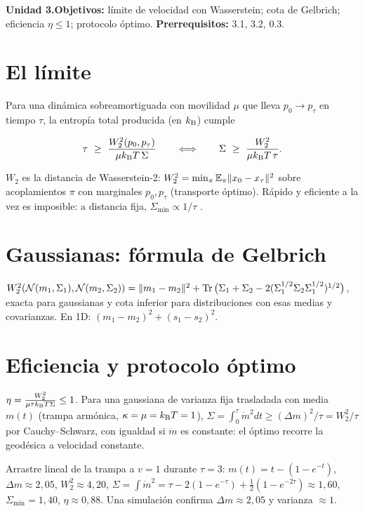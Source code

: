 \documentclass[11pt,a4paper]{article}
\begin{document}

\noindent\textbf{Unidad 3.}\quad\textbf{Objetivos:} límite de velocidad con Wasserstein; cota de Gelbrich; eficiencia $\eta\le1$;
protocolo óptimo. \textbf{Prerrequisitos:} 3.1, 3.2, 0.3.

\section{El límite}
Para una dinámica sobreamortiguada con movilidad $\mu$ que lleva $p_0\to p_\tau$ en tiempo $\tau$, la entropía total producida (en $k_{\mathrm B}$)
cumple
\begin{resultado}
\begin{equation}\tau\ \ge\ \frac{W_2^2(p_0,p_\tau)}{\mu\kB T\,\Sigma}\qquad\Longleftrightarrow\qquad\Sigma\ \ge\ \frac{W_2^2}{\mu\kB T\,\tau}.\end{equation}
\end{resultado}
$W_2$ es la distancia de Wasserstein-2: $W_2^2=\min_\pi\mathbb{E}_\pi\|x_0-x_\tau\|^2$ sobre acoplamientos $\pi$ con marginales $p_0,p_\tau$
(transporte óptimo). Rápido y eficiente a la vez es imposible: a distancia fija, $\Sigma_{\min}\propto1/\tau$ \cite{whitelam}.

\section{Gaussianas: fórmula de Gelbrich}
$W_2^2(\mathcal{N}(m_1,\Sigma_1),\mathcal{N}(m_2,\Sigma_2))=\|m_1-m_2\|^2+\operatorname{Tr}\big(\Sigma_1+\Sigma_2-2(\Sigma_1^{1/2}\Sigma_2\Sigma_1^{1/2})^{1/2}\big)$, exacta para
gaussianas y cota inferior para distribuciones con esas medias y covarianzas. En 1D: $(m_1-m_2)^2+(s_1-s_2)^2$.

\section{Eficiencia y protocolo óptimo}
$\eta=\frac{W_2^2}{\mu\tau k_{\mathrm B} T\Sigma}\le1$. Para una gaussiana de varianza fija trasladada con media $m(t)$ (trampa armónica, $\kappa=\mu=k_{\mathrm B} T=1$),
$\Sigma=\int_0^\tau\dot m^2dt\ge(\Delta m)^2/\tau=W_2^2/\tau$ por Cauchy--Schwarz, con igualdad si $\dot m$ es constante: el óptimo recorre la
geodésica a velocidad constante.
\begin{ejemplo}
Arrastre lineal de la trampa a $v=1$ durante $\tau=3$: $m(t)=t-(1-e^{-t})$, $\Delta m\approx2{,}05$, $W_2^2\approx4{,}20$,
$\Sigma=\int\dot m^2=\tau-2(1-e^{-\tau})+\frac12(1-e^{-2\tau})\approx1{,}60$, $\Sigma_{\min}=1{,}40$, $\eta\approx0{,}88$. Una simulación \evS{}
confirma $\Delta m\approx2{,}05$ y varianza $\approx1$.
\end{ejemplo}
\end{document}
